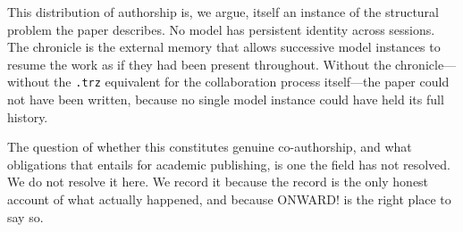 This distribution of authorship is, we argue, itself an instance of the
structural problem the paper describes. No model has persistent identity across
sessions. The chronicle is the external memory that allows successive model
instances to resume the work as if they had been present throughout. Without
the chronicle---without the \texttt{.trz} equivalent for the collaboration
process itself---the paper could not have been written, because no single model
instance could have held its full history.

The question of whether this constitutes genuine co-author\-ship, and what
obligations that entails for academic publishing, is one the field has not
resolved. We do not resolve it here. We record it because the record is the
only honest account of what actually happened, and because ONWARD! is the
right place to say so.
